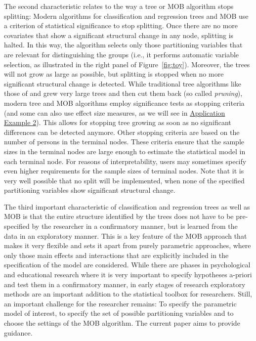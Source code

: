 \documentclass[doc,floatsintext,natbib]{apa7}
\begin{document}
The second characteristic relates to the way a tree or MOB algorithm stops splitting: Modern algorithms for classification and regression trees and MOB use a criterion of statistical significance to stop splitting. Once there are no more covariates that show a significant structural change in any node, splitting is halted. In this way, the  algorithm selects only those partitioning variables that are relevant for distinguishing the groups (i.e., it performs automatic variable selection, as illustrated in the right panel of Figure~\ref{fig:toy}). Moreover, the trees will not grow as large as possible, but splitting is stopped when no more significant structural change is detected. While traditional tree algorithms like those of \citet{Breetal:1984} and \citet{Qui:1993} grew very large trees and then cut them back (so called \textit{pruning}), modern tree and MOB algorithms employ significance tests as stopping criteria (and some can also use effect size measures, as we will see in \hyperref[sec:TutorialRasch]{Application Example 2}). This allows for stopping tree growing as soon as no significant differences can be detected anymore. Other stopping criteria are based on the number of persons in the terminal nodes. These criteria ensure that the sample sizes in the terminal nodes are large enough to estimate the statistical model in each terminal node. For reasons of interpretability, users may sometimes specify even higher requirements for the sample sizes of terminal nodes. Note that it is very well possible that no split will be implemented, when none of the specified partitioning variables show significant structural change. 

The third important characteristic of classification and regression trees as well as MOB is that the entire structure identified by the trees does not have to be pre-specified by the researcher in a confirmatory manner, but is learned from the data in an exploratory manner. This is a key feature of the MOB approach that makes it very flexible and sets it apart from purely parametric approaches, where only those main effects and interactions that are explicitly included in the specification of the model are considered. While there are phases in psychological and educational research where it is very important to specify hypotheses a-priori and test them in a confirmatory manner, in early stages of research exploratory methods are an important addition to the statistical toolbox for researchers. Still, an important challenge for the researcher remains: To specify the parametric model of interest, to specify the set of possible partitioning variables and to choose the settings of the MOB algorithm. The current paper aims to provide guidance. 
\end{document}
